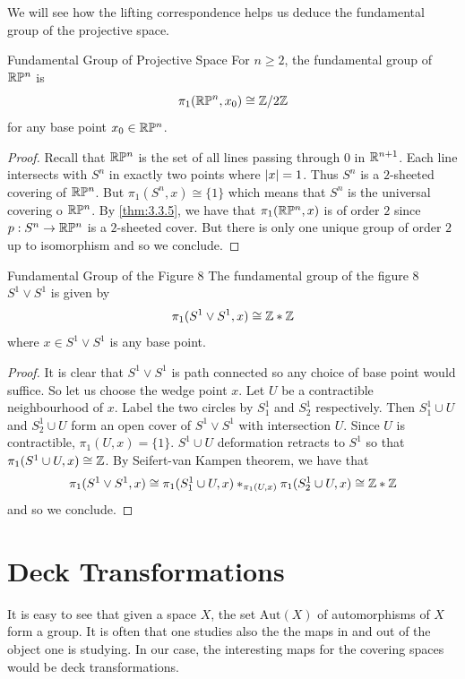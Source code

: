 \documentclass[a4paper]{article}
\begin{document}
We will see how the lifting correspondence helps us deduce the fundamental group of the projective space. 

\begin{thm}{Fundamental Group of Projective Space}{} For $n\geq 2$, the fundamental group of $\mathbb{R}\mathbb{P}^n$ is $$\pi_1(\mathbb{R}\mathbb{P}^n,x_0)\cong\mathbb{Z}/2\mathbb{Z}$$ for any base point $x_0\in\mathbb{R}\mathbb{P}^n$. \tcbline
\begin{proof}
Recall that $\mathbb{R}\mathbb{P}^n$ is the set of all lines passing through $0$ in $\mathbb{R}^{n+1}$. Each line intersects with $S^n$ in exactly two points where $\abs{x}=1$. Thus $S^n$ is a $2$-sheeted covering of $\mathbb{R}\mathbb{P}^n$. But $\pi_1(S^n,x)\cong\{1\}$ which means that $S^n$ is the universal covering o $\mathbb{R}\mathbb{P}^n$. By \ref{thm:3.3.5}, we have that $\pi_1(\mathbb{R}\mathbb{P}^n,x)$ is of order $2$ since $p:S^n\to\mathbb{R}\mathbb{P}^n$ is a $2$-sheeted cover. But there is only one unique group of order $2$ up to isomorphism and so we conclude. 
\end{proof}
\end{thm}

\begin{thm}{Fundamental Group of the Figure 8}{} The fundamental group of the figure 8 $S^1\vee S^1$ is given by $$\pi_1(S^1\vee S^1,x)\cong\mathbb{Z}\ast\mathbb{Z}$$ where $x\in S^1\vee S^1$ is any base point. \tcbline
\begin{proof}
It is clear that $S^1\vee S^1$ is path connected so any choice of base point would suffice. So let us choose the wedge point $x$. Let $U$ be a contractible neighbourhood of $x$. Label the two circles by $S_1^1$ and $S_2^1$ respectively. Then $S_1^1\cup U$ and $S_2^1\cup U$ form an open cover of $S^1\vee S^1$ with intersection $U$. Since $U$ is contractible, $\pi_1(U,x)=\{1\}$. $S^1\cup U$ deformation retracts to $S^1$ so that $\pi_1(S^1\cup U,x)\cong\mathbb{Z}$. By Seifert-van Kampen theorem, we have that $$\pi_1(S^1\vee S^1,x)\cong\pi_1(S_1^1\cup U,x)\ast_{\pi_1(U,x)}\pi_1(S_2^1\cup U,x)\cong\mathbb{Z}\ast\mathbb{Z}$$ and so we conclude. 
\end{proof}
\end{thm}


\pagebreak
\section{Deck Transformations}
It is easy to see that given a space $X$, the set $\text{Aut}(X)$ of automorphisms of $X$ form a group. It is often that one studies also the the maps in and out of the object one is studying. In our case, the interesting maps for the covering spaces would be deck transformations. 
\end{document}
